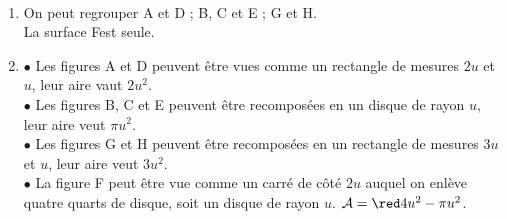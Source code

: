 \begin{corrige}
\ \\ [-5mm]
   \begin{enumerate}
      \item On peut regrouper A et D ; B, C et E ; G et H. \\
         {\red La surface Fest seule}. \smallskip
      \item \textcolor{G1}{$\bullet$} Les figures A et D peuvent être vues comme un rectangle de mesures $2u$ et $u$, leur aire vaut {\red $2u^2$}. \\
         \textcolor{G1}{$\bullet$} Les figures B, C et E peuvent être recomposées en un disque de rayon $u$, leur aire veut {\red $\pi u^2$}. \\
         \textcolor{G1}{$\bullet$} Les figures G et H peuvent être recomposées en un rectangle de mesures $3u$ et $u$, leur aire veut {\red $3u^2$}. \\
         \textcolor{G1}{$\bullet$} La figure F peut être vue comme un carré de côté $2u$ auquel on enlève quatre quarts de disque, soit un disque de rayon $u$. $\mathcal{A} =\red 4u^2-\pi u^2$.
   \end{enumerate}
\end{corrige}
